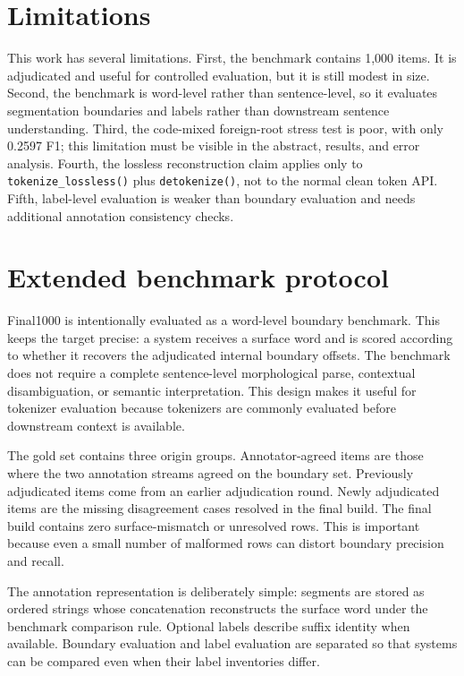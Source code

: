 \documentclass[11pt]{article}
\begin{document}
\section{Limitations}
This work has several limitations. First, the benchmark contains 1,000 items. It is adjudicated and useful for controlled evaluation, but it is still modest in size. Second, the benchmark is word-level rather than sentence-level, so it evaluates segmentation boundaries and labels rather than downstream sentence understanding. Third, the code-mixed foreign-root stress test is poor, with only 0.2597 F1; this limitation must be visible in the abstract, results, and error analysis. Fourth, the lossless reconstruction claim applies only to \texttt{tokenize\_lossless()} plus \texttt{detokenize()}, not to the normal clean token API. Fifth, label-level evaluation is weaker than boundary evaluation and needs additional annotation consistency checks.


\section{Extended benchmark protocol}
Final1000 is intentionally evaluated as a word-level boundary benchmark. This keeps the target precise: a system receives a surface word and is scored according to whether it recovers the adjudicated internal boundary offsets. The benchmark does not require a complete sentence-level morphological parse, contextual disambiguation, or semantic interpretation. This design makes it useful for tokenizer evaluation because tokenizers are commonly evaluated before downstream context is available.

The gold set contains three origin groups. Annotator-agreed items are those where the two annotation streams agreed on the boundary set. Previously adjudicated items come from an earlier adjudication round. Newly adjudicated items are the missing disagreement cases resolved in the final build. The final build contains zero surface-mismatch or unresolved rows. This is important because even a small number of malformed rows can distort boundary precision and recall.

The annotation representation is deliberately simple: segments are stored as ordered strings whose concatenation reconstructs the surface word under the benchmark comparison rule. Optional labels describe suffix identity when available. Boundary evaluation and label evaluation are separated so that systems can be compared even when their label inventories differ.
\end{document}
